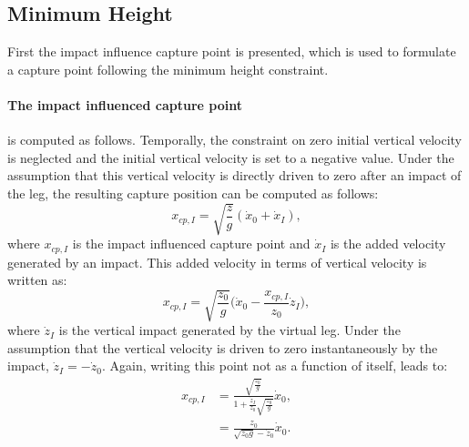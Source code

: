 \subsection{Minimum Height}
First the impact influence capture point is presented, which is used to formulate a capture point following the minimum height constraint.
\paragraph{The impact influenced capture point} is computed as follows. Temporally, the constraint on zero initial vertical velocity is neglected and the initial vertical velocity is set to a negative value. Under the assumption that this vertical velocity is directly driven to zero after an impact of the leg, the resulting capture position can be computed as follows:
\begin{equation}
x_{cp,I} = \sqrt{\frac{z}{g}}(\dot{x}_0+\dot{x}_I),
\end{equation}
where $x_{cp,I}$ is the impact influenced capture point and $\dot{x}_I$ is the added velocity generated by an impact. This added velocity in terms of vertical velocity is written as:
\begin{equation}
x_{cp,I} = \sqrt{\frac{z_0}{g}}\Big(\dot{x}_0-\frac{x_{cp,I}}{z_0}\dot{z}_I\Big),
\end{equation}
where $\dot{z}_I$ is the vertical impact generated by the virtual leg. Under the assumption that the vertical velocity is driven to zero instantaneously by the impact, $\dot{z}_I=-\dot{z}_0$. Again, writing this point not as a function of itself, leads to:
\begin{align}\label{eq:xcpimpact}
x_{cp,I} &= \frac{\sqrt{\frac{z_0}{g}}}{1+\frac{\dot{z}_I}{z_0}\sqrt{\frac{z_0}{g}}}\dot{x}_0,\\
			&= \frac{z_0}{\sqrt{z_0g}-\dot{z}_0}\dot{x}_0.
\end{align}

